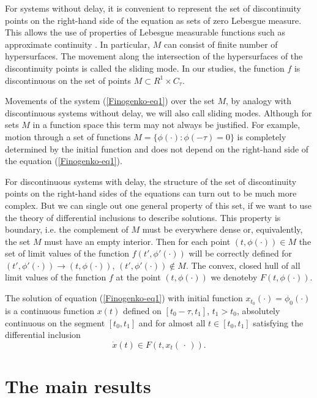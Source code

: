 \documentclass[12pt]{llncs}
\begin{document}
For systems without delay, it is convenient to represent the set of discontinuity points on the right-hand side of the equation as sets of zero Lebesgue measure. This allows the use of properties of Lebesgue measurable functions such as approximate continuity
\cite{Finogenko-second}.
In particular, $M$ can consist of
finite number of hypersurfaces. The movement along the intersection of the hypersurfaces of the discontinuity points is called the sliding mode. In our studies, the function $f$ is discontinuous on the set of points $M\subset R^{1}\times C_{\tau}$.

Movements of the system
(\ref{Finogenko-eq1})
over the set $M$, by analogy with discontinuous systems without delay, we will also call sliding modes. Although for sets $M$ in a function space this term may not always be justified. For example, motion through a set of functions $M=\{\phi(\cdot):\phi(-\tau)=0\}$ is completely determined by the initial function and does not depend on the right-hand side of the equation
(\ref{Finogenko-eq1}).

For discontinuous systems with delay, the structure of the set of discontinuity points on the right-hand sides of the equations can turn out to be much more complex. But we can single out one general property of  this set,  if we want to use  the theory of differential inclusions to describe solutions.  This property is boundary, i.e. the complement of $M$ must be everywhere
dense or, equivalently, the set $M$ must have an empty interior. 
Then for each point $(t,\phi(\cdot))\in M$ the set of limit values of the function $f(t',\phi'(\cdot))$ will be correctly defined for $(t', \phi'(\cdot))\rightarrow (t,\phi(\cdot))$, $(t',\phi'(\cdot))\not\in M$.
The convex, closed hull of all limit values of the function $f$ at the point
 $(t,\phi(\cdot))$ we denoteby $F(t,\phi(\cdot))$.
 
 The solution of equation
 (\ref{Finogenko-eq1})
 with initial function $x_{t_{0}}(\cdot)=\phi_{0}(\cdot)$
 is a continuous function $x(t)$ defined on 
 $[t_{0}-\tau,t_{1}]$, ${t_{1}>t_{0}}$, absolutely continuous on the segment $[t_{0},t_{1}]$
 and for almost all $t\in [t_{0},t_{1}]$ satisfying the differential inclusion
 \begin{equation}
 	\label{Finogenko-eq2}
 	\dot{x}(t)\in F(t,x_{t}(\,\cdot\,)).
 \end{equation}

\section{The main results}
\end{document}
